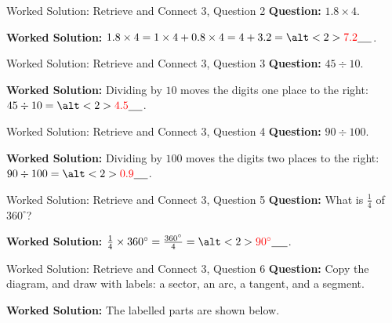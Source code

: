\documentclass{beamer}
\newcommand{\ablank}[1]{%
  \alt<2>{\textcolor{red}{#1}}{\underline{\phantom{#1}}}%
}
\begin{document}
\begin{frame}{Worked Solution: Retrieve and Connect 3, Question 2}
\small
\textbf{Question:} \(1.8\times4\).

\textbf{Worked Solution:} \(1.8\times4=1\times4+0.8\times4=4+3.2=\ablank{7.2}\).
\end{frame}

\begin{frame}{Worked Solution: Retrieve and Connect 3, Question 3}
\small
\textbf{Question:} \(45\div10\).

\textbf{Worked Solution:} Dividing by \(10\) moves the digits one place to the right:
\(45\div10=\ablank{4.5}\).
\end{frame}

\begin{frame}{Worked Solution: Retrieve and Connect 3, Question 4}
\small
\textbf{Question:} \(90\div100\).

\textbf{Worked Solution:} Dividing by \(100\) moves the digits two places to the right:
\(90\div100=\ablank{0.9}\).
\end{frame}

\begin{frame}{Worked Solution: Retrieve and Connect 3, Question 5}
\small
\textbf{Question:} What is \(\frac14\) of \(360^\circ\)?

\textbf{Worked Solution:} \(\frac14\times360^\circ=\frac{360^\circ}{4}=\ablank{90^\circ}\).
\end{frame}

\begin{frame}{Worked Solution: Retrieve and Connect 3, Question 6}
\small
\textbf{Question:} Copy the diagram, and draw with labels: a sector, an arc, a tangent, and a segment.

\textbf{Worked Solution:} The labelled parts are shown below.

\begin{center}
\end{center}
\end{frame}
\end{document}
